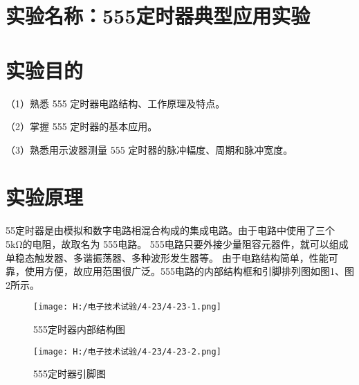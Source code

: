 \documentclass{article}
\begin{document}
	\section{ 实验名称：555定时器典型应用实验}
    \section{ 实验目的}
     （1）熟悉 555 定时器电路结构、工作原理及特点。\par 
               （2）掌握 555 定时器的基本应用。\par
               （3）熟悉用示波器测量 555 定时器的脉冲幅度、周期和脉冲宽度。 \par
   	\section{ 实验原理}
      
       55定时器是由模拟和数字电路相混合构成的集成电路。由于电路中使用了三个 5kΩ的电阻，故取名为 555电路。
       555电路只要外接少量阻容元器件，就可以组成单稳态触发器、多谐振荡器、多种波形发生器等。
       由于电路结构简单，性能可靠，使用方便，故应用范围很广泛。555电路的内部结构框和引脚排列图如图1、图2所示。
       \begin{figure}[h]
        \begin{minipage}[t]{0.5\linewidth} %
          \centering   
          \texttt{[image: H:/电子技术试验/4-23/4-23-1.png]}   
          \caption{555定时器内部结构图}   
          \label{fig:side:a}   
        \end{minipage}%
        \begin{minipage}[t]{0.5\linewidth}   
          \centering   
          \texttt{[image: H:/电子技术试验/4-23/4-23-2.png]}   
          \caption{555定时器引脚图}   
          \label{fig:side:b}   
        \end{minipage}   
      \end{figure}
\end{document}
